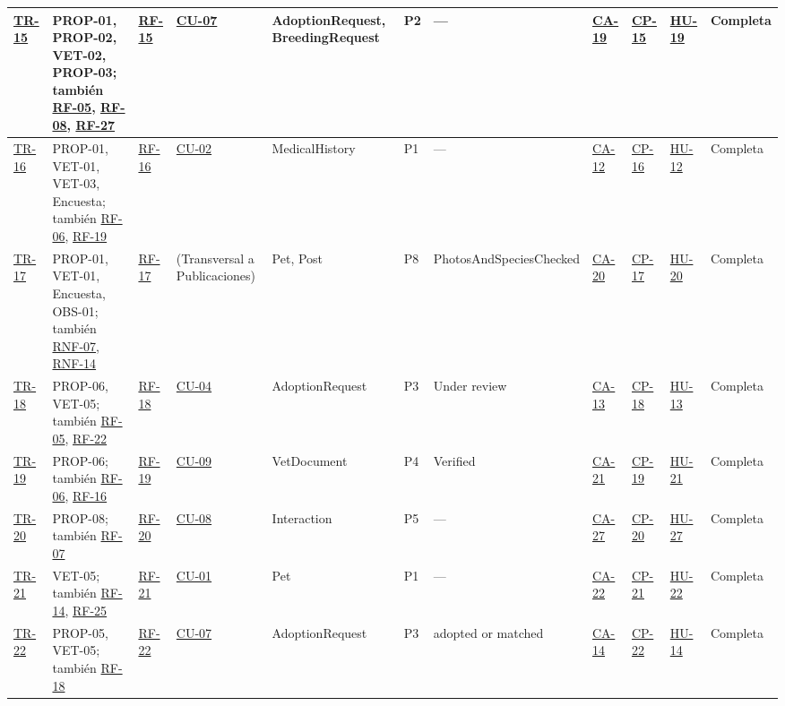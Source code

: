\documentclass[journal,onecolumn]{IEEEtran}
\begin{document}
\begin{landscape}
\begin{longtable}{@{}p{0.8cm} p{4.0cm} p{1.3cm} p{1.7cm} p{2.5cm} p{1.0cm} p{1.9cm} p{0.9cm} p{0.9cm} p{1.75cm} p{2.2cm}@{}}
			\hyperref[tr:15]{TR-15}\label{tr:15} & PROP-01, PROP-02, VET-02, PROP-03; también \hyperref[tab:RF-05]{RF-05}, \hyperref[tab:RF-08]{RF-08}, \hyperref[tab:RF-27]{RF-27} & \hyperref[tab:RF-15]{RF-15} & \hyperref[tab:CU-07]{CU-07} & AdoptionRequest, BreedingRequest & P2 & --- & \hyperref[lst:ca19]{CA-19} & \hyperref[cp:15]{CP-15} & \hyperref[tab:HU-19]{HU-19} & Completa \\ \midrule
			\hyperref[tr:16]{TR-16}\label{tr:16} & PROP-01, VET-01, VET-03, Encuesta; también \hyperref[tab:RF-06]{RF-06}, \hyperref[tab:RF-19]{RF-19} & \hyperref[tab:RF-16]{RF-16} & \hyperref[tab:CU-02]{CU-02} & MedicalHistory & P1 & --- & \hyperref[lst:ca12]{CA-12} & \hyperref[tab:CP-16]{CP-16} & \hyperref[tab:HU-12]{HU-12} & Completa \\ \midrule
			\hyperref[tr:17]{TR-17}\label{tr:17} & PROP-01, VET-01, Encuesta, OBS-01; también \hyperref[tab:RNF-07]{RNF-07}, \hyperref[tab:RNF-14]{RNF-14} & \hyperref[tab:RF-17]{RF-17} & (Transversal a Publicaciones) & Pet, Post & P8 & PhotosAndSpeciesChecked & \hyperref[lst:ca20]{CA-20} & \hyperref[cp:17]{CP-17} & \hyperref[tab:HU-20]{HU-20} & Completa \\ \midrule
			\hyperref[tr:18]{TR-18}\label{tr:18} & PROP-06, VET-05; también \hyperref[tab:RF-05]{RF-05}, \hyperref[tab:RF-22]{RF-22} & \hyperref[tab:RF-18]{RF-18} & \hyperref[tab:CU-04]{CU-04} & AdoptionRequest & P3 & Under review & \hyperref[lst:ca13]{CA-13} & \hyperref[cp:18]{CP-18} & \hyperref[tab:HU-13]{HU-13} & Completa \\ \midrule
			\hyperref[tr:19]{TR-19}\label{tr:19} & PROP-06; también \hyperref[tab:RF-06]{RF-06}, \hyperref[tab:RF-16]{RF-16} & \hyperref[tab:RF-19]{RF-19} & \hyperref[tab:CU-09]{CU-09} & VetDocument & P4 & Verified & \hyperref[lst:ca21]{CA-21} & \hyperref[cp:19]{CP-19} & \hyperref[tab:HU-21]{HU-21} & Completa \\ \midrule
			\hyperref[tr:20]{TR-20}\label{tr:20} & PROP-08; también \hyperref[tab:RF-07]{RF-07} & \hyperref[tab:RF-20]{RF-20} & \hyperref[tab:CU-08]{CU-08} & Interaction & P5 & --- & \hyperref[lst:ca27]{CA-27} & \hyperref[cp:20]{CP-20} & \hyperref[tab:HU-27]{HU-27} & Completa \\ \midrule
			\hyperref[tr:21]{TR-21}\label{tr:21} & VET-05; también \hyperref[tab:RF-14]{RF-14}, \hyperref[tab:RF-25]{RF-25} & \hyperref[tab:RF-21]{RF-21} & \hyperref[tab:CU-01]{CU-01} & Pet & P1 & --- & \hyperref[lst:ca22]{CA-22} & \hyperref[cp:21]{CP-21} & \hyperref[tab:HU-22]{HU-22} & Completa \\ \midrule
			\hyperref[tr:22]{TR-22}\label{tr:22} & PROP-05, VET-05; también \hyperref[tab:RF-18]{RF-18} & \hyperref[tab:RF-22]{RF-22} & \hyperref[tab:CU-07]{CU-07} & AdoptionRequest & P3 & adopted or matched & \hyperref[lst:ca14]{CA-14} & \hyperref[cp:22]{CP-22} & \hyperref[tab:HU-14]{HU-14} & Completa \\ \midrule

\end{longtable}
\end{landscape}
\end{document}
